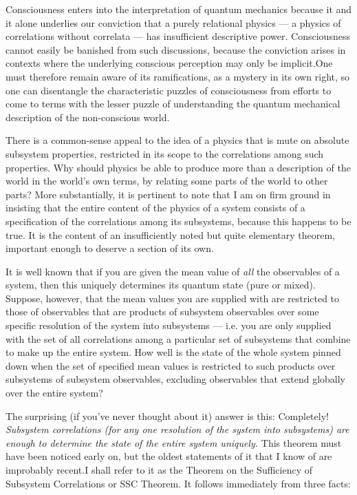Consciousness enters into the interpretation of quantum mechanics
because it and it alone underlies our conviction that a purely relational
physics --- a physics of correlations without correlata --- has
insufficient descriptive power.  Consciousness cannot easily be banished from
such discussions, because the conviction arises in contexts where the
underlying conscious perception may only be implicit.\fn  One must
therefore remain aware of its ramifications, as a mystery in its own
right, so one can disentangle the characteristic puzzles of
consciousness from efforts to come to terms with the lesser puzzle of
understanding the quantum mechanical description of the non-conscious
world.\fn

\bigskip {}
\nobreak\medskip\nobreak There is a common-sense appeal to the idea of
a physics that is mute on absolute subsystem properties, restricted in
its scope to the correlations among such properties.  Why should
physics be able to produce more than a description of the world in the
world's own terms, by relating some parts of the world to other parts?
More substantially, it is pertinent to note that I am on firm ground
in insisting that the entire content of the physics of a system
consists of a specification of the correlations among its subsystems,
because this happens to be true.  It is the content of an
insufficiently noted but quite elementary theorem, important enough to
deserve a section of its own.

 It is well known that if you are given the
mean value of {\it all\/} the observables of a system, then this
uniquely determines its quantum state (pure or mixed).  Suppose,
however, that the mean values you are supplied with are restricted to
those of observables that are products of subsystem observables over
some specific resolution of the system into subsystems --- i.e. you
are only supplied with the set of all correlations among a particular
set of subsystems that combine to make up the entire system.  How well
is the state of the whole system pinned down when the set of specified
mean values is restricted to such products over subsystems of
subsystem observables, excluding observables that extend globally
over the entire system?  

The surprising (if you've never thought about it) answer is this:
Completely!  {\it Subsystem correlations (for any one resolution of
the system into subsystems) are enough to determine the state of the
entire system uniquely.} This theorem must have been noticed early on,
but the oldest statements of it that I know of are
improbably recent.\fn I shall refer to it as the Theorem on the
Sufficiency of Subsystem Correlations or SSC Theorem. It follows
immediately from three facts:

